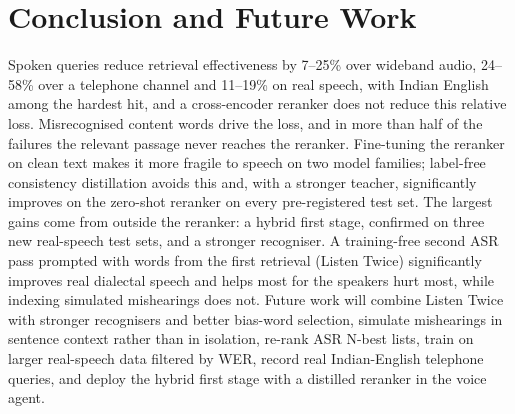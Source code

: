 \documentclass[conference]{IEEEtran}
\begin{document}
\section{Conclusion and Future Work}
Spoken queries reduce retrieval effectiveness by 7--25\% over wideband audio, 24--58\% over a telephone channel and 11--19\% on real speech, with Indian English among the hardest hit, and a cross-encoder reranker does not reduce this relative loss. Misrecognised content words drive the loss, and in more than half of the failures the relevant passage never reaches the reranker. Fine-tuning the reranker on clean text makes it more fragile to speech on two model families; label-free consistency distillation avoids this and, with a stronger teacher, significantly improves on the zero-shot reranker on every pre-registered test set. The largest gains come from outside the reranker: a hybrid first stage, confirmed on three new real-speech test sets, and a stronger recogniser. A training-free second ASR pass prompted with words from the first retrieval (Listen Twice) significantly improves real dialectal speech and helps most for the speakers hurt most, while indexing simulated mishearings does not. Future work will combine Listen Twice with stronger recognisers and better bias-word selection, simulate mishearings in sentence context rather than in isolation, re-rank ASR N-best lists, train on larger real-speech data filtered by WER, record real Indian-English telephone queries, and deploy the hybrid first stage with a distilled reranker in the voice agent.
\end{document}
